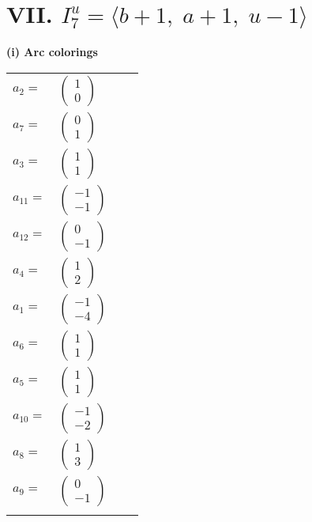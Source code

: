 \documentclass[1p]{elsarticle_modified}
\theoremstyle{definition}
\begin{document}
\centering \section*{VII. $I^u_{7}= \langle b+1,\;a+1,\;u-1 \rangle$}
\flushleft \textbf{(i) Arc colorings}\\
\begin{tabular}{m{7pt} m{180pt} m{7pt} m{180pt} }
\flushright $a_{2}=$&$\begin{pmatrix}1\\0\end{pmatrix}$ \\
\flushright $a_{7}=$&$\begin{pmatrix}0\\1\end{pmatrix}$ \\
\flushright $a_{3}=$&$\begin{pmatrix}1\\1\end{pmatrix}$ \\
\flushright $a_{11}=$&$\begin{pmatrix}-1\\-1\end{pmatrix}$ \\
\flushright $a_{12}=$&$\begin{pmatrix}0\\-1\end{pmatrix}$ \\
\flushright $a_{4}=$&$\begin{pmatrix}1\\2\end{pmatrix}$ \\
\flushright $a_{1}=$&$\begin{pmatrix}-1\\-4\end{pmatrix}$ \\
\flushright $a_{6}=$&$\begin{pmatrix}1\\1\end{pmatrix}$ \\
\flushright $a_{5}=$&$\begin{pmatrix}1\\1\end{pmatrix}$ \\
\flushright $a_{10}=$&$\begin{pmatrix}-1\\-2\end{pmatrix}$ \\
\flushright $a_{8}=$&$\begin{pmatrix}1\\3\end{pmatrix}$ \\
\flushright $a_{9}=$&$\begin{pmatrix}0\\-1\end{pmatrix}$\\&\end{tabular}
\end{document}
